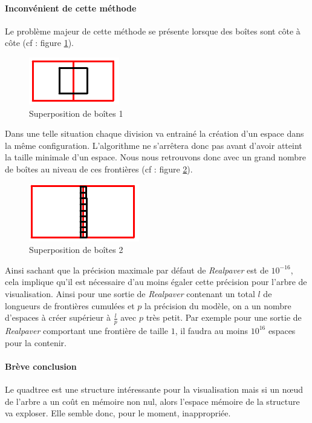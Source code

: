 \paragraph{Inconvénient de cette méthode}Le problème majeur de cette méthode se présente lorsque des boîtes sont côte à côte (cf : figure \ref{fig:frontiere}).
\begin{figure}[htbp]
\centering
\includegraphics[scale=0.40]{img/QT7}
\caption{Superposition de boîtes 1}
\label{fig:frontiere}
\end{figure}
Dans une telle situation chaque division va entrainé la création d'un espace dans la même configuration. L'algorithme ne s'arrêtera donc pas avant d'avoir atteint la taille minimale d'un espace. Nous nous retrouvons donc avec un grand nombre de boîtes au niveau de ces \og frontières\fg{} (cf : figure \ref{fig:frontiere2}).
\begin{figure}[htbp]
\centering
\includegraphics[scale=0.40]{img/QT9}
\caption{Superposition de boîtes 2}
\label{fig:frontiere2}
\end{figure}
Ainsi sachant que la précision maximale par défaut de \emph{Realpaver} est de $10^{-16}$, cela implique qu'il est nécessaire d'au moins égaler cette précision pour l'arbre de visualisation. Ainsi pour une sortie de \emph{Realpaver} contenant un total $l$ de longueurs de \og frontières \fg{}  cumulées et $p$ la précision du modèle, on a un nombre d'espaces à créer supérieur à $\frac{l}{p}$ avec $p$ très petit. Par exemple pour une sortie de \emph{Realpaver} comportant une \og frontière \fg{} de taille $1$, il faudra au moins $10^{16}$ espaces pour la contenir. 

\paragraph{Brève conclusion} Le quadtree est une structure intéressante pour la visualisation mais si un nœud de l'arbre a un coût en mémoire non nul, alors l'espace mémoire de la structure va exploser. Elle semble donc, pour le moment, inappropriée.

